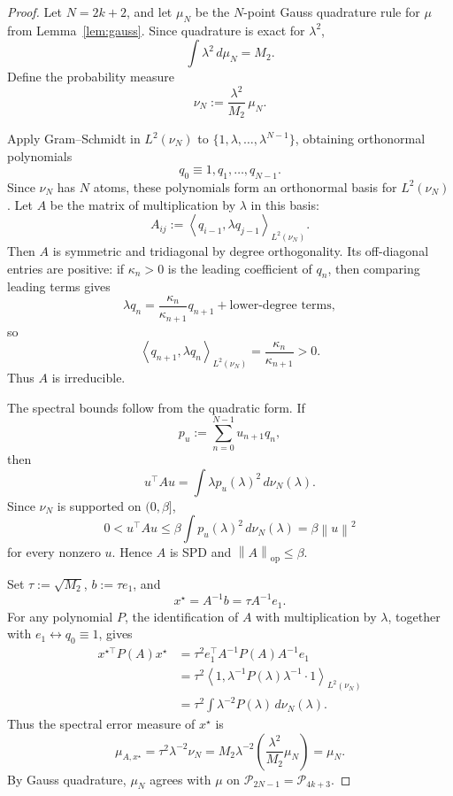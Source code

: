 \documentclass[11pt]{article}
\theoremstyle{definition}
\newcommand{\Pcal}{\mathcal{P}}
\newcommand{\ip}[2]{\left\langle #1,#2\right\rangle}
\newcommand{\norm}[1]{\left\lVert #1\right\rVert}
\newcommand{\op}{\mathrm{op}}
\begin{document}
\begin{proof}
Let \(N=2k+2\), and let \(\mu_N\) be the \(N\)-point Gauss quadrature rule
for \(\mu\) from Lemma~\ref{lem:gauss}.  Since quadrature is exact for
\(\lambda^2\),
\[
  \int \lambda^2\,d\mu_N=M_2.
\]
Define the probability measure
\[
  \nu_N:=\frac{\lambda^2}{M_2}\,\mu_N.
\]

Apply Gram--Schmidt in \(L^2(\nu_N)\) to
\(\{1,\lambda,\ldots,\lambda^{N-1}\}\), obtaining orthonormal polynomials
\[
  q_0\equiv 1,q_1,\ldots,q_{N-1}.
\]
Since \(\nu_N\) has \(N\) atoms, these polynomials form an orthonormal basis
for \(L^2(\nu_N)\).  Let \(A\) be the matrix of multiplication by \(\lambda\)
in this basis:
\[
  A_{ij}:=\ip{q_{i-1}}{\lambda q_{j-1}}_{L^2(\nu_N)}.
\]
Then \(A\) is symmetric and tridiagonal by degree orthogonality.  Its
off-diagonal entries are positive: if \(\kappa_n>0\) is the leading
coefficient of \(q_n\), then comparing leading terms gives
\[
  \lambda q_n
  =
  \frac{\kappa_n}{\kappa_{n+1}}q_{n+1}
  +\text{lower-degree terms},
\]
so
\[
  \ip{q_{n+1}}{\lambda q_n}_{L^2(\nu_N)}
  =
  \frac{\kappa_n}{\kappa_{n+1}}>0.
\]
Thus \(A\) is irreducible.

The spectral bounds follow from the quadratic form.  If
\[
  p_u:=\sum_{n=0}^{N-1}u_{n+1}q_n,
\]
then
\[
  u^\top A u=\int \lambda p_u(\lambda)^2\,d\nu_N(\lambda).
\]
Since \(\nu_N\) is supported on \((0,\beta]\),
\[
  0<u^\top A u
  \le
  \beta \int p_u(\lambda)^2\,d\nu_N(\lambda)
  =
  \beta\norm{u}^2
\]
for every nonzero \(u\).  Hence \(A\) is SPD and \(\norm{A}_{\op}\le\beta\).

Set \(\tau:=\sqrt{M_2}\), \(b:=\tau e_1\), and
\[
  x^\star=A^{-1}b=\tau A^{-1}e_1.
\]
For any polynomial \(P\), the identification of \(A\) with multiplication by
\(\lambda\), together with \(e_1\leftrightarrow q_0\equiv 1\), gives
\[
\begin{aligned}
  x^{\star\top}P(A)x^\star
  &=
  \tau^2 e_1^\top A^{-1}P(A)A^{-1}e_1  \\
  &=
  \tau^2
  \ip{1}{\lambda^{-1}P(\lambda)\lambda^{-1}\cdot 1}_{L^2(\nu_N)}  \\
  &=
  \tau^2\int \lambda^{-2}P(\lambda)\,d\nu_N(\lambda).
\end{aligned}
\]
Thus the spectral error measure of \(x^\star\) is
\[
  \mu_{A,x^\star}
  =
  \tau^2\lambda^{-2}\nu_N
  =
  M_2\lambda^{-2}\left(\frac{\lambda^2}{M_2}\mu_N\right)
  =
  \mu_N.
\]
By Gauss quadrature, \(\mu_N\) agrees with \(\mu\) on
\(\Pcal_{2N-1}=\Pcal_{4k+3}\).
\end{proof}
\end{document}
